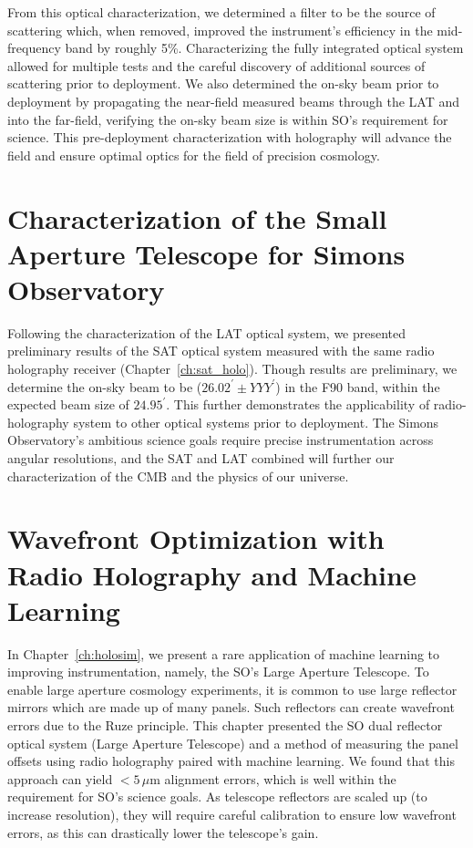 From this optical characterization, we determined a filter to be the source of scattering which, when removed, improved the instrument's efficiency in the mid-frequency band by roughly 5\%.  Characterizing the fully integrated optical system allowed for multiple tests and the careful discovery of additional sources of scattering prior to deployment.  We also determined the on-sky beam prior to deployment by propagating the near-field measured beams through the LAT and into the far-field, verifying the on-sky beam size is within SO's requirement for science.  This pre-deployment characterization with holography will advance the field and ensure optimal optics for the field of precision cosmology.

\section{Characterization of the Small Aperture Telescope for Simons Observatory}
Following the characterization of the LAT optical system, we presented preliminary results of the SAT optical system measured with the same radio holography receiver (Chapter~\ref{ch:sat_holo}).  Though results are preliminary, we determine the on-sky beam to be ($26.02^{\prime}\pm YYY^{\prime}$) in the F90 band, within the expected beam size of $24.95^{\prime}$.  This further demonstrates the applicability of radio-holography system to other optical systems prior to deployment.  The Simons Observatory's ambitious science goals require precise instrumentation across angular resolutions, and the SAT and LAT combined will further our characterization of the CMB and the physics of our universe.

\section{Wavefront Optimization with Radio Holography and Machine Learning}

In Chapter~\ref{ch:holosim}, we present a rare application of machine learning to improving instrumentation, namely, the SO's Large Aperture Telescope.  To enable large aperture cosmology experiments, it is common to use large reflector mirrors which are made up of many panels.  Such reflectors can create wavefront errors due to the Ruze principle.  This chapter presented the SO dual reflector optical system (Large Aperture Telescope) and a method of measuring the panel offsets using radio holography paired with machine learning.  We found that this approach can yield $<5\,\mu$m alignment errors, which is well within the requirement for SO's science goals.  As telescope reflectors are scaled up (to increase resolution), they will require careful calibration to ensure low wavefront errors, as this can drastically lower the telescope's gain.


